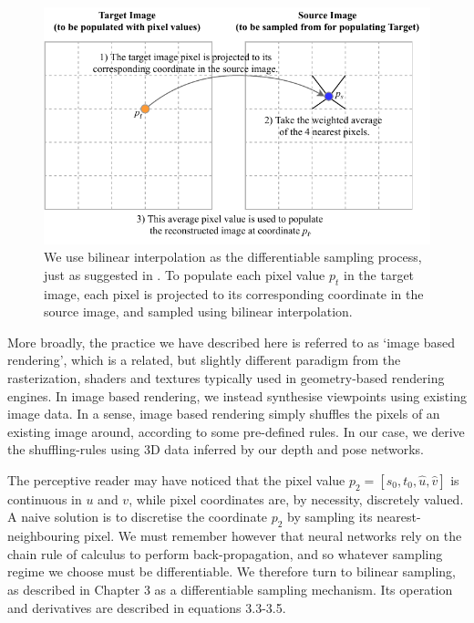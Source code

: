 \begin{figure}
    \centering
    \includegraphics[width=\textwidth]{images/interp.pdf}
    \caption[How bilinear interpolation is used to populate a target image]{We use bilinear interpolation as the differentiable sampling process, just as suggested in \cite{zhou2017unsupervised}. To populate each pixel value $p_t$ in the target image, each pixel is projected to its corresponding coordinate in the source image, and sampled using bilinear interpolation.}
\end{figure}

More broadly, the practice we have described here is referred to as `image based rendering', which is a related, but slightly different paradigm from the rasterization, shaders and textures typically used in geometry-based rendering engines. In image based rendering, we instead synthesise viewpoints using existing image data. In a sense, image based rendering simply shuffles the pixels of an existing image around, according to some pre-defined rules. In our case, we derive the shuffling-rules using 3D data inferred by our depth and pose networks. 

The perceptive reader may have noticed that the pixel value $p_2 = [s_0, t_0, \hat{u}, \hat{v}]$ is continuous in $u$ and $v$, while pixel coordinates are, by necessity, discretely valued. A naive solution is to discretise the coordinate $p_2$ by sampling its nearest-neighbouring pixel. We must remember however that neural networks rely on the chain rule of calculus to perform back-propagation, and so whatever sampling regime we choose must be differentiable. We therefore turn to bilinear sampling, as described in Chapter 3 as a differentiable sampling mechanism. Its operation and derivatives are described in equations 3.3-3.5.

